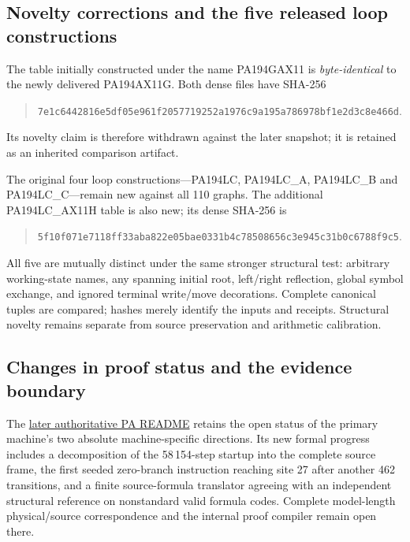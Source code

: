 

\subsection{Novelty corrections and the five released loop constructions}

The table initially constructed under the name PA194GAX11 is
\emph{byte-identical} to the newly delivered PA194AX11G. Both dense files
have SHA-256
\begin{quote}\small
\nolinkurl{7e1c6442816e5df05e961f2057719252a1976c9a195a786978bf1e2d3c8e466d}.
\end{quote}
Its novelty claim is therefore withdrawn against the later snapshot;
it is retained as an inherited comparison artifact.

The original four loop constructions---PA194LC, PA194LC\_A,
PA194LC\_B and PA194LC\_C---remain new against all 110 graphs. The
additional PA194LC\_AX11H table is also new; its dense SHA-256 is
\begin{quote}\small
\nolinkurl{5f10f071e7118ff33aba822e05bae0331b4c78508656c3e945c31b0c6788f9c5}.
\end{quote}
All five are mutually distinct under the same stronger structural test:
arbitrary working-state names, any spanning initial root, left/right
reflection, global symbol exchange, and ignored terminal write/move
decorations. Complete canonical tuples are compared; hashes merely
identify the inputs and receipts. Structural novelty remains separate
from source preservation and arithmetic calibration.

\subsection{Changes in proof status and the evidence boundary}

The
\href{https://github.com/VladimirReshetnikov/ProveIt/blob/603c58ca3bd6bf3222fcfc4e308e6b079f65d573/Computability/BusyBeaver/Research/PA/README.md}{later authoritative PA README}
retains the open status of the primary machine's two absolute
machine-specific directions. Its new formal progress includes a
decomposition of the 58\,154-step startup into the complete source frame,
the first seeded zero-branch instruction reaching site 27 after another
462 transitions, and a finite source-formula translator agreeing with
an independent structural reference on nonstandard valid formula codes.
Complete model-length physical/source correspondence and the internal
proof compiler remain open there.

